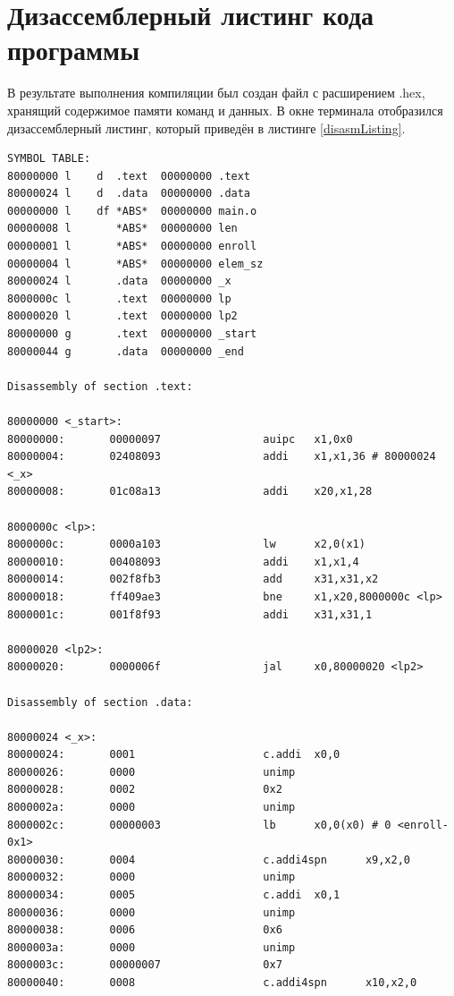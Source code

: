 \documentclass[12pt]{report}
\begin{document}
\section{Дизассемблерный листинг кода программы}
В результате выполнения компиляции был создан файл с расширением .hex, хранящий содержимое памяти команд и данных. В окне терминала отобразился дизассемблерный листинг, который приведён в листинге \ref{disasmListing}.
\newpage
\begin{lstlisting}[label=disasmListing,caption=Дизассемблерный листинг кода программы]
SYMBOL TABLE:
80000000 l    d  .text  00000000 .text
80000024 l    d  .data  00000000 .data
00000000 l    df *ABS*  00000000 main.o
00000008 l       *ABS*  00000000 len
00000001 l       *ABS*  00000000 enroll
00000004 l       *ABS*  00000000 elem_sz
80000024 l       .data  00000000 _x
8000000c l       .text  00000000 lp
80000020 l       .text  00000000 lp2
80000000 g       .text  00000000 _start
80000044 g       .data  00000000 _end

Disassembly of section .text:

80000000 <_start>:
80000000:       00000097                auipc   x1,0x0
80000004:       02408093                addi    x1,x1,36 # 80000024 <_x>
80000008:       01c08a13                addi    x20,x1,28

8000000c <lp>:
8000000c:       0000a103                lw      x2,0(x1)
80000010:       00408093                addi    x1,x1,4
80000014:       002f8fb3                add     x31,x31,x2
80000018:       ff409ae3                bne     x1,x20,8000000c <lp>
8000001c:       001f8f93                addi    x31,x31,1

80000020 <lp2>:
80000020:       0000006f                jal     x0,80000020 <lp2>

Disassembly of section .data:

80000024 <_x>:
80000024:       0001                    c.addi  x0,0
80000026:       0000                    unimp
80000028:       0002                    0x2
8000002a:       0000                    unimp
8000002c:       00000003                lb      x0,0(x0) # 0 <enroll-0x1>
80000030:       0004                    c.addi4spn      x9,x2,0
80000032:       0000                    unimp
80000034:       0005                    c.addi  x0,1
80000036:       0000                    unimp
80000038:       0006                    0x6
8000003a:       0000                    unimp
8000003c:       00000007                0x7
80000040:       0008                    c.addi4spn      x10,x2,0

\end{lstlisting}
\end{document}

